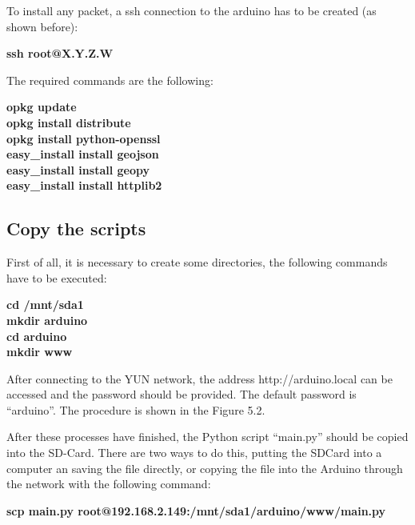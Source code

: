 \documentclass[12pt, a4paper,twoside]{tesi_upf}
\begin{document}
    To install any packet, a ssh connection to the arduino has to be created (as shown before):
    
    {\begin{centering} \textbf{ssh root@X.Y.Z.W}\par \end{centering}}
    
    The required commands are the following:
     
      {\begin{centering} \textbf{
          opkg update \\
          opkg install distribute \\
          opkg install python-openssl \\
          easy\_install install geojson \\
          easy\_install install geopy \\
          easy\_install install httplib2
        }
      \par \end{centering}}
    
  \subsection{Copy the scripts}
    First of all, it is necessary to create some directories, the following commands have to be executed:
    
    {\begin{centering} \textbf{
    cd /mnt/sda1 \\
    mkdir arduino \\
    cd arduino \\
    mkdir www \\
    }\par \end{centering}}
    
    After connecting to the YUN network, the address http://arduino.local can be accessed and the password should be provided. The default password is “arduino”. The procedure is shown in the Figure 5.2.
    
    After these processes have finished, the Python script ``main.py'' should be copied into the SD-Card. There are two ways to do this, putting the SDCard into a computer an saving the file directly, or copying the file into the Arduino through the network with the following command:
    
    {\begin{centering} \textbf{
    scp main.py root@192.168.2.149:/mnt/sda1/arduino/www/main.py
    }\par \end{centering}}
  
\end{document}
